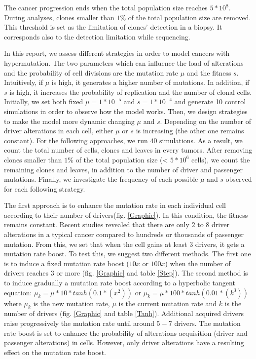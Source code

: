 \documentclass[a4paper]{article}
\begin{document}
\begin{multicols}{2}
The cancer progression ends when the total population size reaches $5*10^8$. During analyses, clones smaller than $1\%$ of the total population size are removed. This threshold is set as the limitation of clones' detection in a biopsy. It corresponds also to the detection limitation while sequencing.


In this report, we assess different strategies in order to model cancers with hypermutation. The two parameters which can influence the load of alterations and the probability of cell divisions are the mutation rate $\mu$ and the fitness $s$. Intuitively, if $\mu$ is high, it generates a higher number of mutations. In addition, if $s$ is high, it increases the probability of replication and the number of clonal cells. Initially, we set both fixed $\mu=1*10^{-5}$ and $s=1*10^{-4}$ and generate 10 control simulations in order to observe how the model works. Then, we design strategies to make the model more dynamic changing $\mu$ and $s$. Depending on the number of driver alterations in each cell, either $\mu$ or $s$ is increasing (the other one remains constant). For the following approaches, we run $40$ simulations. As a result, we count the total number of cells, clones and leaves in every tumors. After removing clones smaller than $1\%$ of the total population size (< $5*10^6$ cells), we count the remaining clones and leaves, in addition to the number of driver and passenger mutations. Finally, we investigate the frequency of each possible $\mu$ and $s$ observed for each following strategy.


The first approach is to enhance the mutation rate in each individual cell according to their number of drivers(fig. \ref{Graphic}). In this condition, the fitness remains constant. Recent studies revealed that there are only $2$ to $8$ driver alterations in a typical cancer compared to hundreds or thousands of passenger mutation\cite{BGN}. From this, we set that when the cell gains at least $3$ drivers, it gets a mutation rate boost. To test this, we suggest two different methods. The first one is to induce a fixed mutation rate boost ($10x$ or $100x$) when the number of drivers reaches $3$ or more (fig. \ref{Graphic} and table \ref{Step}). The second method is to induce gradually a mutation rate boost according to a hyperbolic tangent equation: $\mu_k=\mu*10*tanh(0.1*(x^2))$ or $\mu_k=\mu*100*tanh(0.01*(k^3))$ where $\mu_k$ is the new mutation rate, $\mu$ is the current mutation rate and $k$ is the number of drivers (fig. \ref{Graphic} and table \ref{Tanh}). Additional acquired drivers raise progressively the mutation rate until around $5-7$ drivers. The mutation rate boost is set to enhance the probability of alterations acquisition (driver and passenger alterations) in cells. However, only driver alterations have a resulting effect on the mutation rate boost.

\end{multicols}
\end{document}
